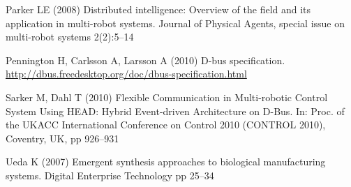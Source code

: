 \documentclass[smallcondensed]{svjour3}
\begin{document}
\begin{thebibliography}{22}
Parker LE (2008) Distributed intelligence: Overview of the field and its
  application in multi-robot systems. Journal of Physical Agents, special issue
  on multi-robot systems 2(2):5--14

Pennington H, Carlsson A, Larsson A (2010) D-bus specification.
  \urlprefix\url{http://dbus.freedesktop.org/doc/dbus-specification.html}

Sarker M, Dahl T (2010) {Flexible Communication in Multi-robotic Control System
  Using HEAD: Hybrid Event-driven Architecture on D-Bus}. In: Proc. of the
  UKACC International Conference on Control 2010 (CONTROL 2010), Coventry, UK,
  pp 926--931

Ueda K (2007) Emergent synthesis approaches to biological manufacturing systems. Digital Enterprise Technology pp 25--34

\end{thebibliography}
% 
%
%
%            
\end{document}
